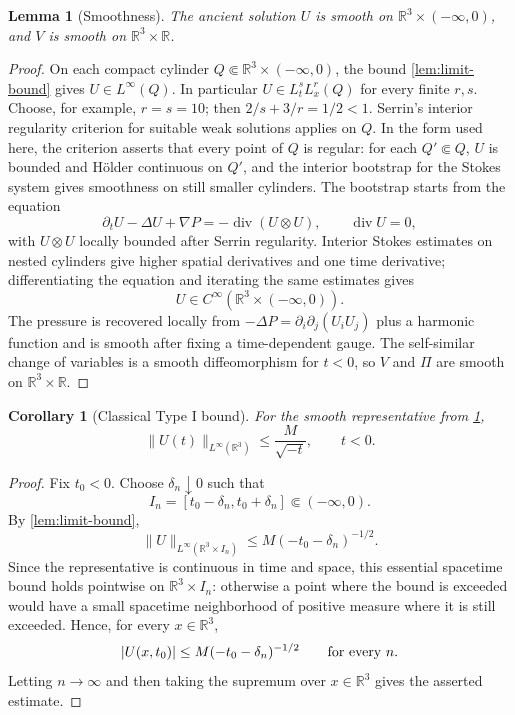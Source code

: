 \documentclass[11pt]{amsart}
\theoremstyle{plain}
\newtheorem{lemma}[theorem]{Lemma}
\newtheorem{corollary}[theorem]{Corollary}
\theoremstyle{definition}
\theoremstyle{remark}
\numberwithin{equation}{section}
\newcommand{\R}{\mathbb R}
\newcommand{\divergence}{\operatorname{div}}
\begin{document}
\begin{lemma}[Smoothness]\label{lem:smoothness}
The ancient solution \(U\) is smooth on
\(\R^3\times(-\infty,0)\), and \(V\) is smooth on \(\R^3\times\R\).
\end{lemma}

\begin{proof}
On each compact cylinder \(Q\Subset\R^3\times(-\infty,0)\), the bound
\cref{lem:limit-bound} gives \(U\in L^\infty(Q)\).  In particular
\(U\in L^s_tL^r_x(Q)\) for every finite \(r,s\).  Choose, for example,
\(r=s=10\); then \(2/s+3/r=1/2<1\).  Serrin's interior regularity criterion
\cite{Serrin1962,Sohr2001} for suitable weak solutions applies on \(Q\).  In
the form used here, the criterion asserts that every point of \(Q\) is regular:
for each \(Q'\Subset Q\), \(U\) is bounded and H\"older continuous on \(Q'\),
and the interior bootstrap for the Stokes system gives smoothness on still
smaller cylinders.  The bootstrap starts from the equation
\[
   \partial_tU-\Delta U+\nabla P=-\divergence(U\otimes U),
   \qquad \divergence U=0,
\]
with \(U\otimes U\) locally bounded after Serrin regularity.  Interior Stokes
estimates on nested cylinders give higher spatial derivatives and one time
derivative; differentiating the equation and iterating the same estimates gives
\[
   U\in C^\infty(\R^3\times(-\infty,0)).
\]
The pressure is recovered locally from
\(-\Delta P=\partial_i\partial_j(U_iU_j)\) plus a harmonic function and is
smooth after fixing a time-dependent gauge.  The self-similar change of
variables is a smooth diffeomorphism for \(t<0\), so \(V\) and \(\Pi\) are
smooth on \(\R^3\times\R\).
\end{proof}

\begin{corollary}[Classical Type I bound]\label{cor:classical-type-I-bound}
For the smooth representative from \cref{lem:smoothness},
\[
   \|U(t)\|_{L^\infty(\R^3)}
   \le \frac{M}{\sqrt{-t}},
   \qquad t<0.
\]
\end{corollary}

\begin{proof}
Fix \(t_0<0\).  Choose \(\delta_n\downarrow0\) such that
\[
   I_n=[t_0-\delta_n,t_0+\delta_n]\Subset(-\infty,0).
\]
By \cref{lem:limit-bound},
\[
   \|U\|_{L^\infty(\R^3\times I_n)}
   \le M(-t_0-\delta_n)^{-1/2}.
\]
Since the representative is continuous in time and space, this essential
spacetime bound holds pointwise on \(\R^3\times I_n\): otherwise a point where
the bound is exceeded would have a small spacetime neighborhood of positive
measure where it is still exceeded.  Hence, for every \(x\in\R^3\),
\[
   |U(x,t_0)|
   \le M(-t_0-\delta_n)^{-1/2}
   \qquad\hbox{for every }n.
\]
Letting \(n\to\infty\) and then taking the supremum over \(x\in\R^3\) gives
the asserted estimate.
\end{proof}
\end{document}
